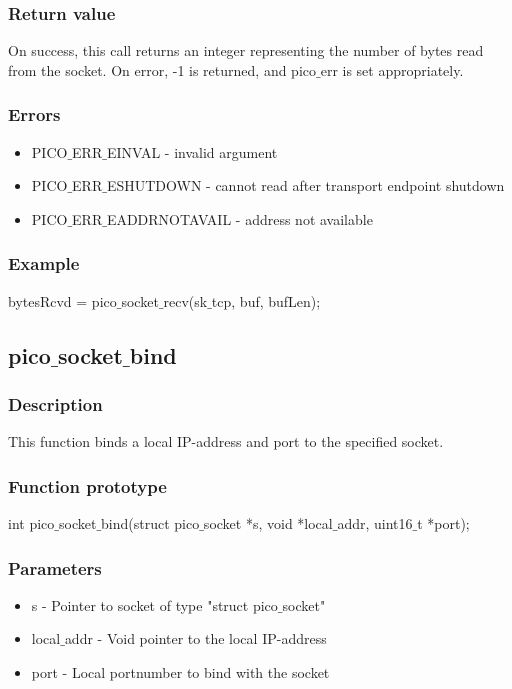 \subsubsection*{Return value}
On success, this call returns an integer representing the number of bytes read
from the socket. On error, -1 is returned, and pico$\_$err is set appropriately.

\subsubsection*{Errors}
\begin{itemize}
\item PICO$\_$ERR$\_$EINVAL - invalid argument
\item PICO$\_$ERR$\_$ESHUTDOWN - cannot read after transport endpoint shutdown
\item PICO$\_$ERR$\_$EADDRNOTAVAIL - address not available
\end{itemize}

\subsubsection*{Example}
bytesRcvd = pico$\_$socket$\_$recv(sk$\_$tcp, buf, bufLen);


\subsection{pico$\_$socket$\_$bind}

\subsubsection*{Description}
This function binds a local IP-address and port to the specified socket.

\subsubsection*{Function prototype}
int pico$\_$socket$\_$bind(struct pico$\_$socket *s, void *local$\_$addr, uint16$\_$t *port);

\subsubsection*{Parameters}
\begin{itemize}
\item s - Pointer to socket of type "struct pico$\_$socket"
\item local$\_$addr - Void pointer to the local IP-address
\item port - Local portnumber to bind with the socket
\end{itemize}

